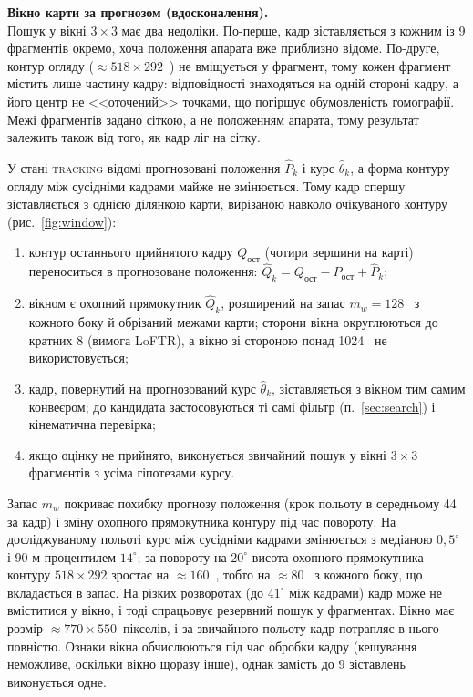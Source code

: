 \documentclass[a4paper, 12pt, titlepage]{article}
\begin{document}
\textbf{Вікно карти за прогнозом (вдосконалення).}\\
Пошук у вікні $3 \times 3$ має два недоліки. По-перше, кадр зіставляється з кожним із 9 фрагментів окремо, хоча положення апарата вже приблизно відоме. По-друге, контур огляду ($\approx 518 \times 292$~\px{}) не вміщується у фрагмент, тому кожен фрагмент містить лише частину кадру: відповідності знаходяться на одній стороні кадру, а його центр не <<оточений>> точками, що погіршує обумовленість гомографії. Межі фрагментів задано сіткою, а не положенням апарата, тому результат залежить також від того, як кадр ліг на сітку.

У стані \textsc{tracking} відомі прогнозовані положення $\hat{P}_k$ і курс $\hat{\theta}_k$, а форма контуру огляду між сусідніми кадрами майже не змінюється. Тому кадр спершу зіставляється з однією ділянкою карти, вирізаною навколо очікуваного контуру (рис.~\ref{fig:window}):
\begin{enumerate}
    \item контур останнього прийнятого кадру $Q_{\text{ост}}$ (чотири вершини на карті) переноситься в прогнозоване положення: $\hat{Q}_k = Q_{\text{ост}} - P_{\text{ост}} + \hat{P}_k$;
    \item вікном є охопний прямокутник $\hat{Q}_k$, розширений на запас $m_w = 128$~\px{} з кожного боку й обрізаний межами карти; сторони вікна округлюються до кратних 8 (вимога LoFTR), а вікно зі стороною понад 1024~\px{} не використовується;
    \item кадр, повернутий на прогнозований курс $\hat{\theta}_k$, зіставляється з вікном тим самим конвеєром; до кандидата застосовуються ті самі фільтр (п.~\ref{sec:search}) і кінематична перевірка;
    \item якщо оцінку не прийнято, виконується звичайний пошук у вікні $3 \times 3$ фрагментів з усіма гіпотезами курсу.
\end{enumerate}
Запас $m_w$ покриває похибку прогнозу положення (крок польоту в середньому 44~\px{} за кадр) і зміну охопного прямокутника контуру під час повороту. На досліджуваному польоті курс між сусідніми кадрами змінюється з медіаною $0{,}5^\circ$ і 90-м процентилем $14^\circ$; за повороту на $20^\circ$ висота охопного прямокутника контуру $518 \times 292$ зростає на $\approx 160$~\px{}, тобто на $\approx 80$~\px{} з кожного боку, що вкладається в запас. На різких розворотах (до $41^\circ$ між кадрами) кадр може не вміститися у вікно, і тоді спрацьовує резервний пошук у фрагментах. Вікно має розмір $\approx 770 \times 550$~пікселів, і за звичайного польоту кадр потрапляє в нього повністю. Ознаки вікна обчислюються під час обробки кадру (кешування неможливе, оскільки вікно щоразу інше), однак замість до 9 зіставлень виконується одне.
\end{document}
